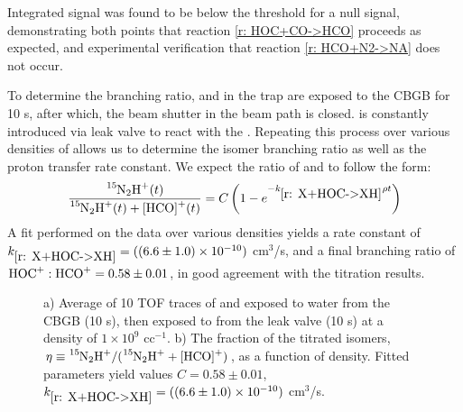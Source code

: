 Integrated  signal was found to be below the threshold for a null signal, demonstrating both points that reaction \ref{r: HOC+CO->HCO} proceeds as expected, and experimental verification that reaction \ref{r: HCO+N2->NA} does not occur.

To determine the branching ratio,  and  in the trap are exposed to the CBGB for 10 s, after which, the beam shutter in the beam path is closed.  is constantly introduced via leak valve to react with the . Repeating this process over various densities of  allows us to determine the isomer branching ratio as well as the proton transfer rate constant. We expect the ratio of  and \ce{[HCO]+} to follow the form:
\begin{equation}
	\frac{\ce{^{15}N2H+}(t)}{\ce{^{15}N2H+}(t)+\ce{[HCO]+}(t)} = C \left( 1-e^{-k_{\ref{r: X+HOC->XH}} \rho t} \right)
	\label{eq: N2 asymptote}
\end{equation}
A fit performed on the data over various densities yields a rate constant of $k_{\ref{r: X+HOC->XH}} = ((6.6 \pm 1.0) \times 10^{-10})$ cm$^3$/s, and a final branching ratio of $\ce{HOC+}:\ce{HCO+} = 0.58 \pm 0.01$, in good agreement with the  titration results.

\begin{figure}[H]
	\centering
	\caption{a) Average of 10 TOF traces of  and  exposed to water from the CBGB (10 s), then exposed to  from the leak valve (10 s) at a density of $1 \times 10^9$ cc$^{-1}$. b) The fraction of the titrated isomers, $\eta \equiv \ce{^{15}N2H+}/(\ce{^{15}N2H+}+\ce{[HCO]+})$, as a function of  density. Fitted parameters yield values $C = 0.58 \pm 0.01$, $k_{\ref{r: X+HOC->XH}} = ((6.6 \pm 1.0) \times 10^{-10})$ cm$^3$/s.}
	\label{fig: N2 pressure scan}
\end{figure}

